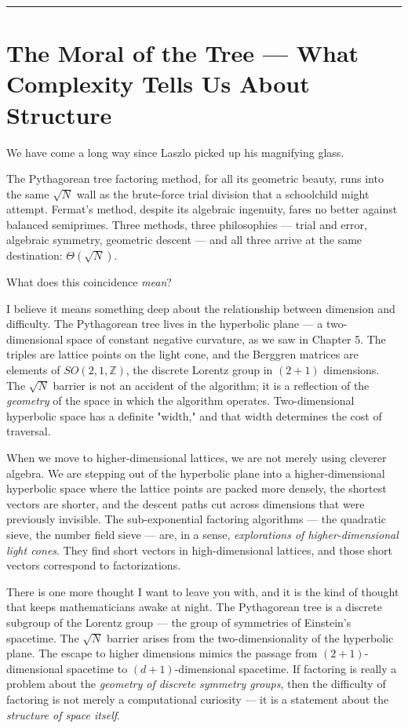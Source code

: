 \documentclass[12pt, letterpaper, openany]{book}
\theoremstyle{definition}
\theoremstyle{remark}
\begin{document}
\bigskip\noindent\rule{\textwidth}{0.4pt}\bigskip



\section*{The Moral of the Tree --- What Complexity Tells Us About Structure}


We have come a long way since Laszlo picked up his magnifying glass.

The Pythagorean tree factoring method, for all its geometric beauty, runs into the same $\sqrt{N}$ wall as the brute-force trial division that a schoolchild might attempt. Fermat's method, despite its algebraic ingenuity, fares no better against balanced semiprimes. Three methods, three philosophies --- trial and error, algebraic symmetry, geometric descent --- and all three arrive at the same destination: $\Theta(\sqrt{N})$.

What does this coincidence \textit{mean}?

I believe it means something deep about the relationship between dimension and difficulty. The Pythagorean tree lives in the hyperbolic plane --- a two-dimensional space of constant negative curvature, as we saw in Chapter 5. The triples are lattice points on the light cone, and the Berggren matrices are elements of $SO(2, 1, \mathbb{Z})$, the discrete Lorentz group in $(2+1)$ dimensions. The $\sqrt{N}$ barrier is not an accident of the algorithm; it is a reflection of the \textit{geometry} of the space in which the algorithm operates. Two-dimensional hyperbolic space has a definite "width," and that width determines the cost of traversal.

When we move to higher-dimensional lattices, we are not merely using cleverer algebra. We are stepping out of the hyperbolic plane into a higher-dimensional hyperbolic space where the lattice points are packed more densely, the shortest vectors are shorter, and the descent paths cut across dimensions that were previously invisible. The sub-exponential factoring algorithms --- the quadratic sieve, the number field sieve --- are, in a sense, \textit{explorations of higher-dimensional light cones}. They find short vectors in high-dimensional lattices, and those short vectors correspond to factorizations.

There is one more thought I want to leave you with, and it is the kind of thought that keeps mathematicians awake at night. The Pythagorean tree is a discrete subgroup of the Lorentz group --- the group of symmetries of Einstein's spacetime. The $\sqrt{N}$ barrier arises from the two-dimensionality of the hyperbolic plane. The escape to higher dimensions mimics the passage from $(2+1)$-dimensional spacetime to $(d+1)$-dimensional spacetime. If factoring is really a problem about the \textit{geometry of discrete symmetry groups}, then the difficulty of factoring is not merely a computational curiosity --- it is a statement about the \textit{structure of space itself}.
\end{document}

